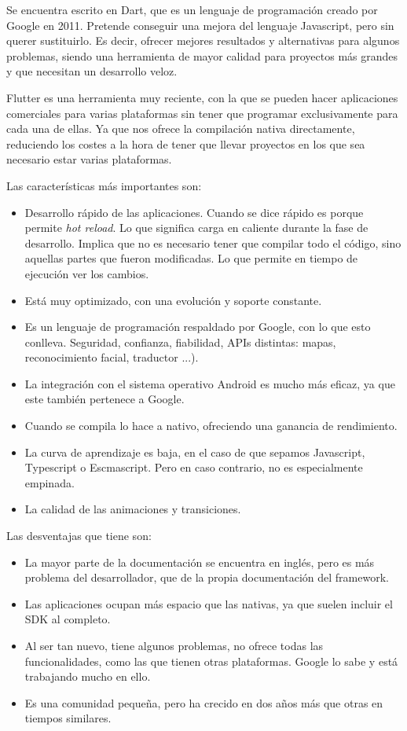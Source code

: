 Se encuentra escrito en Dart, que es un lenguaje de programación creado por Google en 2011. Pretende conseguir una mejora del lenguaje Javascript, pero sin querer sustituirlo. Es decir, ofrecer mejores resultados y alternativas para algunos problemas, siendo una herramienta de mayor calidad para proyectos más grandes y que necesitan un desarrollo veloz.

Flutter es una herramienta muy reciente, con la que se pueden hacer aplicaciones comerciales para varias plataformas sin tener que programar exclusivamente para cada una de ellas. Ya que nos ofrece la compilación nativa directamente, reduciendo los costes a la hora de tener que llevar proyectos en los que sea necesario estar varias plataformas.

Las características más importantes son: 

\begin{itemize}
	\item Desarrollo rápido de las aplicaciones. Cuando se dice rápido es porque permite \emph{hot reload}. Lo que significa carga en caliente durante la fase de desarrollo. Implica que no es necesario tener que compilar todo el código, sino aquellas partes que fueron modificadas. Lo que permite en tiempo de ejecución ver los cambios.
	\item Está muy optimizado, con una evolución y soporte constante.
	\item Es un lenguaje de programación respaldado por Google, con lo que esto conlleva. Seguridad, confianza, fiabilidad, APIs distintas: mapas, reconocimiento facial, traductor ...).
	\item La integración con el sistema operativo Android es mucho más eficaz, ya que este también pertenece a Google.
	\item Cuando se compila lo hace a nativo, ofreciendo una ganancia de rendimiento.
	\item La curva de aprendizaje es baja, en el caso de que sepamos Javascript, Typescript o Escmascript. Pero en caso contrario, no es especialmente empinada.
	\item La calidad de las animaciones y transiciones.
\end{itemize}

Las desventajas que tiene son:
\begin{itemize}
	\item La mayor parte de la documentación se encuentra en inglés, pero es más problema del desarrollador, que de la propia documentación del framework.
	\item Las aplicaciones ocupan más espacio que las nativas, ya que suelen incluir el SDK al completo.
	\item Al ser tan nuevo, tiene algunos problemas, no ofrece todas las funcionalidades, como las que tienen otras plataformas. Google lo sabe y está trabajando mucho en ello.
	\item Es una comunidad pequeña, pero ha crecido en dos años más que otras en tiempos similares.
\end{itemize}

